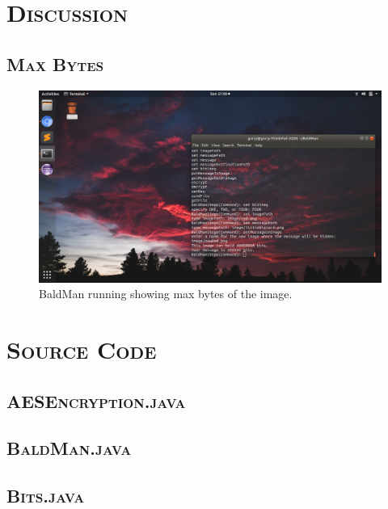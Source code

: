 \documentclass[12pt]{article}
\begin{document}
	
	\section[Discussion]{\Large{}\selectfont\scshape Discussion}
	
	\subsection[Max Bytes]{\hspace*{1em}\large{}\selectfont\scshape Max Bytes}
	
	\begin{figure}[h]
		\centering
		\includegraphics[keepaspectratio=true, width=0.8\linewidth]{screenshot.png}
		\caption{BaldMan running showing max bytes of the image.}
	\end{figure}
	
	\section[Source Code]{\Large{}\selectfont\scshape Source Code}
	
	\subsection[AESEncryption]{\hspace*{1em}\large{}\selectfont\scshape AESEncryption.java}
	
	
	\subsection[BaldMan]{\hspace*{1em}\large{}\selectfont\scshape BaldMan.java}
	
	
	\subsection[Bits]{\hspace*{1em}\large{}\selectfont\scshape Bits.java}
	
	
\end{document}
